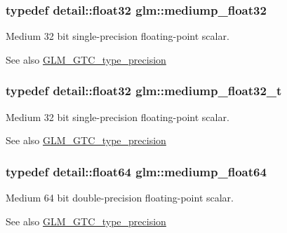 \subsubsection[{\texorpdfstring{mediump\+\_\+float32}{mediump_float32}}]{\setlength{\rightskip}{0pt plus 5cm}typedef detail\+::float32 {\bf glm\+::mediump\+\_\+float32}}\hypertarget{group__gtc__type__precision_ga1b5f74cbeed0c9d42cd57d77609be7ee}{}\label{group__gtc__type__precision_ga1b5f74cbeed0c9d42cd57d77609be7ee}
Medium 32 bit single-\/precision floating-\/point scalar. \begin{DoxySeeAlso}{See also}
\hyperlink{group__gtc__type__precision}{G\+L\+M\+\_\+\+G\+T\+C\+\_\+type\+\_\+precision} 
\end{DoxySeeAlso}
\subsubsection[{\texorpdfstring{mediump\+\_\+float32\+\_\+t}{mediump_float32_t}}]{\setlength{\rightskip}{0pt plus 5cm}typedef detail\+::float32 {\bf glm\+::mediump\+\_\+float32\+\_\+t}}\hypertarget{group__gtc__type__precision_gacbd406715148db96c9d9d2a2ef6460de}{}\label{group__gtc__type__precision_gacbd406715148db96c9d9d2a2ef6460de}
Medium 32 bit single-\/precision floating-\/point scalar. \begin{DoxySeeAlso}{See also}
\hyperlink{group__gtc__type__precision}{G\+L\+M\+\_\+\+G\+T\+C\+\_\+type\+\_\+precision} 
\end{DoxySeeAlso}
\subsubsection[{\texorpdfstring{mediump\+\_\+float64}{mediump_float64}}]{\setlength{\rightskip}{0pt plus 5cm}typedef detail\+::float64 {\bf glm\+::mediump\+\_\+float64}}\hypertarget{group__gtc__type__precision_ga9225ae6aed0f90b6eb65bf8d466199c1}{}\label{group__gtc__type__precision_ga9225ae6aed0f90b6eb65bf8d466199c1}
Medium 64 bit double-\/precision floating-\/point scalar. \begin{DoxySeeAlso}{See also}
\hyperlink{group__gtc__type__precision}{G\+L\+M\+\_\+\+G\+T\+C\+\_\+type\+\_\+precision} 
\end{DoxySeeAlso}

